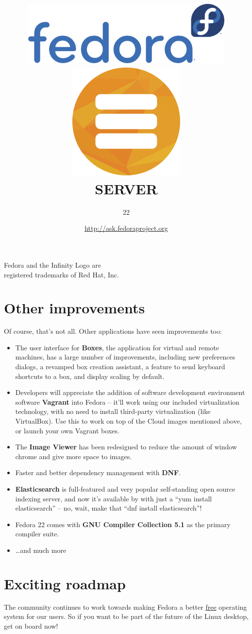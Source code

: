 \documentclass[
notumble,
letterpaper,
10pt
]{leaflet}
\title{\includegraphics[keepaspectratio,width=0.8\textwidth]{Logo_fedoralogo.png}\vspace{1cm}\\\includegraphics[keepaspectratio,scale=0.5]{logo-color-server.png}\\\vspace{0.5cm}\LARGE{\textcolor{ResolutionBlue}{SERVER}}}
\author{\LARGE{\textcolor{ResolutionBlue}{22}}}
\date{\href{http://ask.fedoraproject.org}{http://ask.fedoraproject.org}}
\begin{document}
\maketitle
\thispagestyle{empty}
\vspace{5cm}
\begin{center}\small{Fedora and the Infinity Logo are\\registered trademarks of Red Hat, Inc.}\end{center}

\newpage


\section{\textcolor{FedoraBlue}{Other improvements}}
Of course, that's not all. Other applications have seen improvements too:
\begin{itemize}
  \item The user interface for \textbf{Boxes}, the application for virtual and remote machines, has a large number of improvements, including new preferences dialogs, a revamped box creation assistant, a feature to send keyboard shortcuts to a box, and display scaling by default.
  \item Developers will appreciate the addition of software development environment software \textbf{Vagrant} into Fedora -- it'll work using our included virtualization technology, with no need to install third-party virtualization (like VirtualBox). Use this to work on top of the Cloud images mentioned above, or launch your own Vagrant boxes.
  \item The \textbf{Image Viewer} has been redesigned to reduce the amount of window chrome and give more space to images. 
  \item Faster and better dependency management with \textbf{DNF}.
  \item \textbf{Elasticsearch} is full-featured and very popular self-standing open source indexing server, and now it's available by with just a ``yum install elasticsearch'' -- no, wait, make that ``dnf install elasticsearch''! 
  \item Fedora 22 comes with \textbf{GNU Compiler Collection 5.1} as the primary compiler suite.
  \item \ldots and much more
\end{itemize}

\section{\textcolor{FedoraBlue}{Exciting roadmap}}
The community continues to work towards making Fedora a better \href{http://www.gnu.org/philosophy/free-sw.en.html}{free} operating system for our users.  So if you want to be part of the future of the Linux desktop, get on board now!
\end{document}
